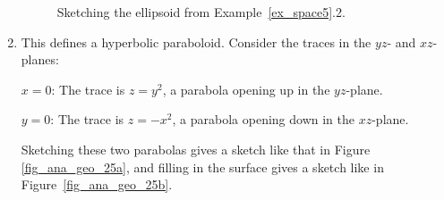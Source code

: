 \begin{example}
\begin{enumerate}[align=left]
		\begin{figure}[H]
\centering
\centerline{
\hspace{0.1cm}
}
\caption{Sketching the ellipsoid from Example~\ref{ex_space5}.2.}
\end{figure}

\ifanalysis	\pagebreak\fi
	\item		This defines a hyperbolic paraboloid. Consider the traces in the $yz$- and $xz$-planes:
	
	$x=0$: 	The trace is $z=y^2$, a parabola opening up in the $yz$-plane.
	
	$y=0$: 	The trace is $z=-x^2$, a parabola opening down in the $xz$-plane. 
	
	Sketching these two parabolas gives a sketch like that in Figure \ref{fig_ana_geo_25a}, and filling in the surface gives a sketch like in Figure~\ref{fig_ana_geo_25b}.
	

\end{enumerate}
\end{example}
